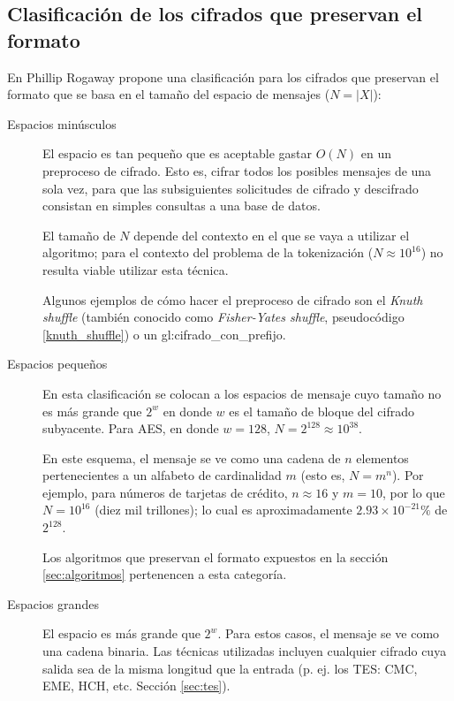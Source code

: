 \subsection{Clasificación de los cifrados que preservan el formato}

En \cite{sinopsis_rogaway} Phillip Rogaway propone una clasificación para los
cifrados que preservan el formato que se basa en el tamaño del espacio de
mensajes ($ N = |X| $):

\begin{description}

  \item[Espacios minúsculos]

    El espacio es tan pequeño que es aceptable gastar $ O(N) $ en un preproceso
    de cifrado. Esto es, cifrar todos los posibles mensajes de una sola vez,
    para que las subsiguientes solicitudes de cifrado y descifrado consistan en
    simples consultas a una base de datos.

    El tamaño de $ N $ depende del contexto en el que se vaya a utilizar el
    algoritmo; para el contexto del problema de la tokenización
    ($ N \approx 10^{16} $) no resulta viable utilizar esta técnica.

    Algunos ejemplos de cómo hacer el preproceso de cifrado son el
    \textit{Knuth shuffle} (también conocido como \textit{Fisher-Yates shuffle},
    pseudocódigo \ref{knuth_shuffle}) o un \gls{gl:cifrado_con_prefijo}.

  \item[Espacios pequeños]

    En esta clasificación se colocan a los espacios de mensaje cuyo tamaño
    no es más grande que $ 2^w $ en donde $ w $ es el tamaño de bloque del
    cifrado subyacente. Para AES, en donde $ w = 128 $, $ N = 2^{128}
    \approx 10^{38} $.

    En este esquema, el mensaje se ve como una cadena de $ n $ elementos
    pertenecientes a un alfabeto de cardinalidad $ m $ (esto es, $ N = m^n $).
    Por ejemplo, para números de tarjetas de crédito, $ n \approx 16 $ y
    $ m = 10 $, por lo que $ N = 10^{16} $ (diez mil trillones); lo cual es
    aproximadamente $ 2.93 \times 10^{-21} \% $ de $ 2^{128} $.

    Los algoritmos que preservan el formato expuestos en la sección
    \ref{sec:algoritmos} pertenencen a esta categoría.

  \item[Espacios grandes]

    El espacio es más grande que $ 2^w $. Para estos casos, el mensaje se ve
    como una cadena binaria. Las técnicas utilizadas incluyen cualquier cifrado
    cuya salida sea de la misma longitud que la entrada (p. ej. los
    TES: CMC, EME, HCH, etc. Sección \ref{sec:tes}).

\end{description}

